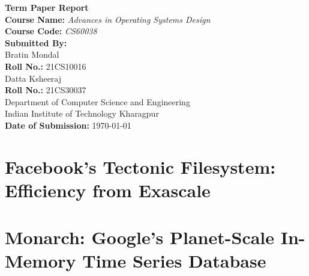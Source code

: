 \documentclass[12pt]{report}
\begin{document}
\sloppy
\begin{titlepage}
    \centering
    \vspace*{1.5in}
    {\Huge\bfseries Term Paper Report\\[1.5em]}
    {\large \textbf{Course Name:} \textit{Advances in Operating Systems Design}}\\[0.5em]
    {\large \textbf{Course Code:} \textit{CS60038}}\\
    \vspace{1in}
    {\large \textbf{Submitted By:}}\\[1em]
    {\large Bratin Mondal\\\textbf{Roll No.:} 21CS10016}\\[1em]
    {\large Datta Ksheeraj\\\textbf{Roll No.:} 21CS30037}\\
    \vspace{1in}
    {\large Department of Computer Science and Engineering}\\[0.5em]
    {\large Indian Institute of Technology Kharagpur}\\
    \vfill
    {\large \textbf{Date of Submission:} \today}
\end{titlepage}

\tableofcontents
\newpage

\chapter{Facebook's Tectonic Filesystem: Efficiency from Exascale}









\chapter{Monarch: Google's Planet-Scale In-Memory Time Series Database}
















\end{document}
